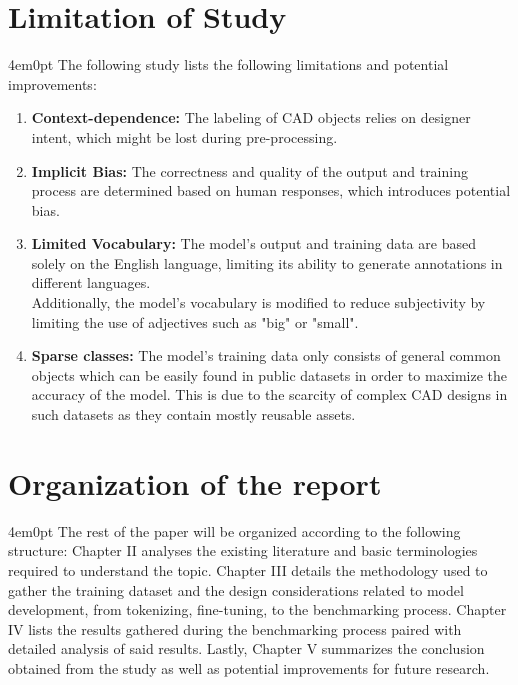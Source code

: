 \section{Limitation of Study}
\begin{indentedblock}{4em}{0pt}
	The following study lists the following limitations and potential improvements:
	\begin{enumerate}
		\item \textbf{Context-dependence:} The labeling of CAD objects relies on designer intent, which might be lost during pre-processing.
		\item \textbf{Implicit Bias:} The correctness and quality of the output and training process are determined based on human responses, which introduces potential bias.
		\item {
			\textbf{Limited Vocabulary:} The model's output and training data are based solely on the English language, limiting its ability to generate annotations in different languages. \\
			Additionally, the model's vocabulary is modified to reduce subjectivity by limiting the use of adjectives such as "big" or "small".
		}
		\item \textbf{Sparse classes:} The model's training data only consists of general common objects which can be easily found in public datasets in order to maximize the accuracy of the model. This is due to the scarcity of complex CAD designs in such datasets as they contain mostly reusable assets.
	\end{enumerate}
\end{indentedblock}

\section{Organization of the report}
	\begin{indentedblock}{4em}{0pt}
		The rest of the paper will be organized according to the following structure: Chapter II analyses the existing literature and basic terminologies required to understand the topic. Chapter III details the methodology used to gather the training dataset and the design considerations related to model development, from tokenizing, fine-tuning, to the benchmarking process. Chapter IV lists the results gathered during the benchmarking process paired with detailed analysis of said results. Lastly, Chapter V summarizes the conclusion obtained from the study as well as potential improvements for future research.
	\end{indentedblock}
\endgroup